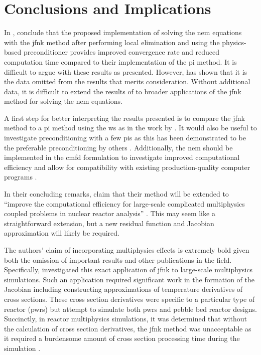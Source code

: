 \section{Conclusions and Implications}
\label{sec:conclusion}

  In , \citeauthor{qe2paper} conclude that the proposed
  implementation of solving the \gls{nem} equations with the \gls{jfnk} method
  after performing local elimination and using the physics-based preconditioner
  provides improved convergence rate and reduced computation time compared to
  their implementation of the \gls{pi} method. It is difficult to argue with
  these results as presented. However,  has shown that it is
  the data omitted from the results that merits consideration. Without
  additional data, it is difficult to extend the results of
  \citeauthor{qe2paper} to broader applications of the \gls{jfnk} method for
  solving the \gls{nem} equations.

  A first step for better interpreting the results presented is to compare the
  \gls{jfnk} method to a \gls{pi} method using the \gls{ws} as in the work by
  \citeauthor{jfnk_wielandt}. It would also be useful to investigate
  preconditioning with a few \glspl{pi} as this has been demonstrated to be the
  preferable preconditioning by others \cite{gill_azmy,jfnk_wielandt}.
  Additionally, the \gls{nem} should be implemented in the \gls{cmfd}
  formulation to investigate improved computational efficiency and allow for
  compatibility with existing production-quality computer programs 
  \cite{palmtagThesis,smith_nonlinear}.

  In their concluding remarks, \citeauthor{qe2paper} claim that their method
  will be extended to ``improve the computational efficiency for large-scale
  complicated multiphysics coupled problems in nuclear reactor analysis''
  \cite{qe2paper}. This may seem like a straightforward extension, but a new
  residual function and Jacobian approximation will likely be required.

  The authors' claim of incorporating multiphysics effects is extremely bold
  given both the omission of important results and other publications in the
  field. Specifically, \citeauthor{caslJFNK} investigated this exact application
  of \gls{jfnk} to large-scale multiphysics simulations. Such an application
  required significant work in the formation of the Jacobian including
  constructing approximations of temperature derivatives of cross sections.
  These cross section derivatives were specific to a particular type of reactor
  (\glspl{pwr}) but \citeauthor{qe2paper} attempt to simulate both \glspl{pwr}
  and pebble bed reactor designs. Succinctly, in reactor multiphysics
  simulations, it was determined that without the calculation of cross section
  derivatives, the \gls{jfnk} method was unacceptable as it required a
  burdensome amount of cross section processing time during the simulation
  \cite{caslJFNK}.

